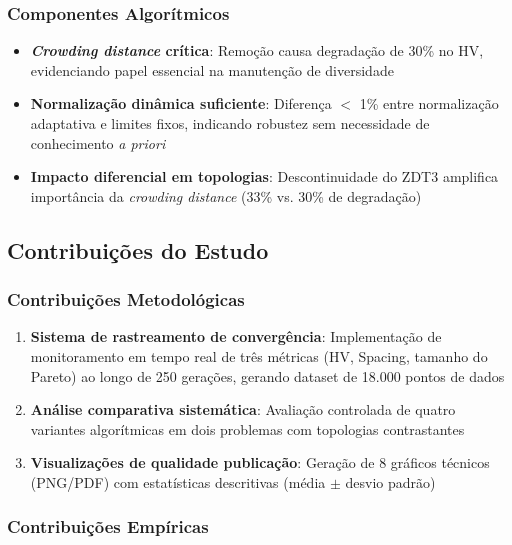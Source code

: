 \subsubsection{Componentes Algorítmicos}

\begin{itemize}
    \item \textbf{\textit{Crowding distance} crítica}: Remoção causa degradação de 30\% no HV, evidenciando papel essencial na manutenção de diversidade
    
    \item \textbf{Normalização dinâmica suficiente}: Diferença $<$ 1\% entre normalização adaptativa e limites fixos, indicando robustez sem necessidade de conhecimento \textit{a priori}
    
    \item \textbf{Impacto diferencial em topologias}: Descontinuidade do ZDT3 amplifica importância da \textit{crowding distance} (33\% vs. 30\% de degradação)
\end{itemize}

\subsection{Contribuições do Estudo}

\subsubsection{Contribuições Metodológicas}

\begin{enumerate}
    \item \textbf{Sistema de rastreamento de convergência}: Implementação de monitoramento em tempo real de três métricas (HV, Spacing, tamanho do Pareto) ao longo de 250 gerações, gerando dataset de 18.000 pontos de dados
    
    \item \textbf{Análise comparativa sistemática}: Avaliação controlada de quatro variantes algorítmicas em dois problemas com topologias contrastantes
    
    \item \textbf{Visualizações de qualidade publicação}: Geração de 8 gráficos técnicos (PNG/PDF) com estatísticas descritivas (média $\pm$ desvio padrão)
\end{enumerate}

\subsubsection{Contribuições Empíricas}


